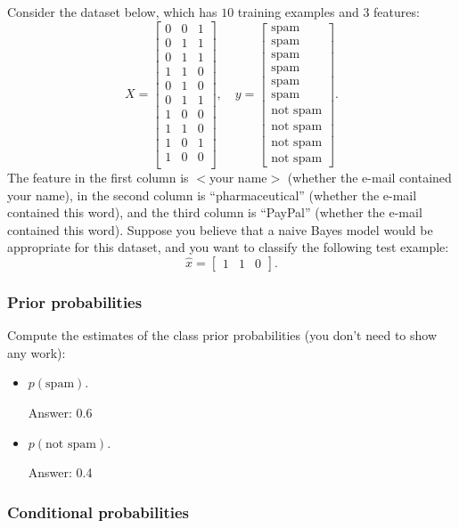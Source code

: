\documentclass{article}
\def\ans#1{\par\gre{Answer: #1}}
\def\blu#1{{\color{blu}#1}}
\def\gre#1{{\color{gre}#1}}
\def\items#1{\begin{itemize}#1\end{itemize}}
\begin{document}
Consider the dataset below, which has $10$ training examples and $3$ features:
\[
X = \begin{bmatrix}0 & 0 & 1\\0 & 1 & 1\\ 0 & 1 & 1\\ 1 & 1 & 0\\0 & 1 & 0\\0 & 1 & 1\\1 & 0 & 0\\1 & 1 & 0\\1 & 0 & 1\\1 & 0 & 0\\\end{bmatrix}, \quad y = \begin{bmatrix}\text{spam}\\\text{spam}\\\text{spam}\\\text{spam}\\\text{spam}\\\text{spam}\\\text{not spam}\\\text{not spam}\\\text{not spam}\\\text{not spam}\end{bmatrix}.
\]
The feature in the first column is $<$your name$>$ (whether the e-mail contained your name), in the second column is ``pharmaceutical'' (whether the e-mail contained this word), and the third column is ``PayPal'' (whether the e-mail contained this word).
Suppose you believe that a naive Bayes model would be appropriate for this dataset, and you want to classify the following test example:
\[
\hat{x} = \begin{bmatrix}1 & 1 & 0\end{bmatrix}.
\]

\subsubsection{Prior probabilities}

\blu{Compute the estimates of the class prior probabilities} (you don't need to show any work):
\items{
\item$ p(\text{spam})$.
	\ans{0.6}
\item $p(\text{not spam})$.
	\ans{0.4}
}

\subsubsection{Conditional probabilities}
\end{document}
